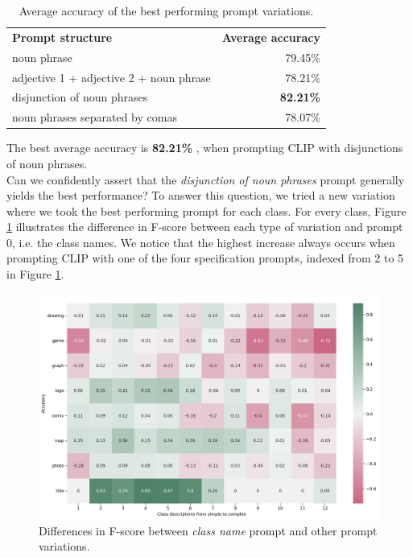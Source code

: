 \begin{table}[h]
    \centering
    \begin{tabular}{lr}
    \rowcolor{gray!25}
        \textbf{Prompt structure} & \textbf{Average accuracy} \\
        noun phrase & 79.45\% \\
        adjective 1 + adjective 2 + noun phrase & 78.21\% \\
        disjunction of noun phrases & \bf 82.21\% \\
        noun phrases separated by comas & 78.07\%\\
    \end{tabular}
    \caption{Average accuracy of the best performing prompt variations.}
    \label{tab:best-prompts}
\end{table}

The best average accuracy is \textbf{82.21\% }, when prompting CLIP with disjunctions of noun phrases. 
\\Can we confidently assert that the \textit{disjunction of noun phrases} prompt generally yields the best performance? To answer this question, we tried a new variation where we took the best performing prompt for each class. For every class, Figure \ref{fig:F1-score-difference} illustrates the difference in F-score between each type of variation and prompt 0, i.e. the class names. We notice that the highest increase always occurs when prompting CLIP with one of the four specification prompts, indexed from 2 to 5 in Figure \ref{fig:F1-score-difference}. 


\begin{figure}[ht]
  \centering
  \includegraphics[width=0.7\linewidth]{Images/CLIP-results/F1-score difference.png}
  \caption{Differences in F-score between \textit{class name} prompt and other prompt variations.}
  \label{fig:F1-score-difference}
\end{figure}

